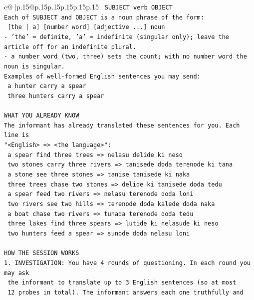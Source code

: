 \documentclass{article}
\begin{document}
{\begin{supertabular}{c@{$\;$}|p{.15\linewidth}@{}p{.15\linewidth}p{.15\linewidth}p{.15\linewidth}p{.15\linewidth}p{.15\linewidth}}
{{{\texttt{    SUBJECT  verb  OBJECT} \\
\texttt{Each of SUBJECT and OBJECT is a noun phrase of the form:} \\
\texttt{    {[}the | a{]}  {[}number word{]}  {[}adjective ...{]}  noun} \\
\texttt{{-} 'the' = definite, 'a' = indefinite (singular only); leave the article off for an indefinite plural.} \\
\texttt{{-} a number word (two, three) sets the count; with no number word the noun is singular.} \\
\texttt{Examples of well{-}formed English sentences you may send:} \\
\texttt{    a hunter carry a spear} \\
\texttt{    three hunters carry a spear} \\
\\ 
\texttt{WHAT YOU ALREADY KNOW} \\
\texttt{The informant has already translated these sentences for you. Each line is} \\
\texttt{"<English>  =>  <the language>":} \\
\texttt{    a spear find three trees  =>  nelasu delide ki neso} \\
\texttt{    two stones carry three rivers  =>  tanisede doda terenode ki tana} \\
\texttt{    a stone see three stones  =>  tanise tanisede ki naka} \\
\texttt{    three trees chase two stones  =>  delide ki tanisede doda tedu} \\
\texttt{    a spear feed two rivers  =>  nelasu terenode doda loni} \\
\texttt{    two rivers see two hills  =>  terenode doda kalede doda naka} \\
\texttt{    a boat chase two rivers  =>  tunada terenode doda tedu} \\
\texttt{    three lakes find three spears  =>  lutide ki nelasude ki neso} \\
\texttt{    two hunters feed a spear  =>  sunode doda nelasu loni} \\
\\ 
\texttt{HOW THE SESSION WORKS} \\
\texttt{1. INVESTIGATION: You have 4 rounds of questioning. In each round you may ask} \\
\texttt{   the informant to translate up to 3 English sentences (so at most} \\
\texttt{   12 probes in total). The informant answers each one truthfully and} \\
}}}
\end{supertabular}}
\end{document}
